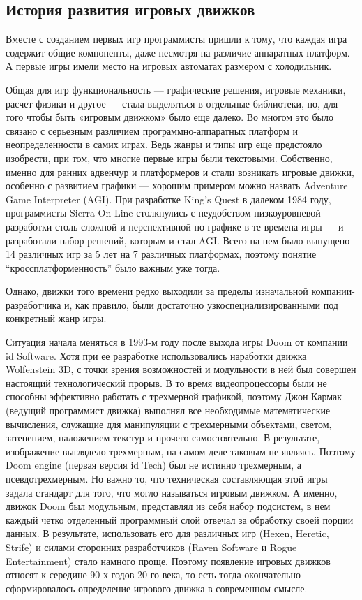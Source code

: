 \subsection{История развития игровых движков}
\label{sub:domain:game_engint_hist}
Вместе с созданием первых игр программисты пришли к тому, что каждая игра содержит общие компоненты, даже несмотря на различие аппаратных платформ. А первые игры имели место на игровых автоматах размером с холодильник.

Общая для игр функциональность — графические решения, игровые механики, расчет физики и другое — стала выделяться в отдельные библиотеки, но, для того чтобы быть «игровым движком» было еще далеко. Во многом это было связано с серьезным различием программно-аппаратных платформ и неопределенности в самих играх. Ведь жанры и типы игр еще предстояло изобрести, при том, что многие первые игры были текстовыми. Собственно, именно для ранних адвенчур и платформеров и стали возникать игровые движки, особенно с развитием графики — хорошим примером можно назвать Adventure Game Interpreter (AGI). При разработке King’s Quest в далеком 1984 году, программисты Sierra On-Line столкнулись с неудобством низкоуровневой разработки столь сложной и перспективной по графике в те времена игры — и разработали набор решений, которым и стал AGI. Всего на нем было выпущено 14 различных игр за 5 лет на 7 различных платформах, поэтому понятие “кроссплатформенность” было важным уже тогда.

Однако, движки того времени редко выходили за пределы изначальной компании-разработчика и, как правило, были достаточно узкоспециализированными под конкретный жанр игры.

Ситуация начала меняться в 1993-м году после выхода игры Doom от компании id Software. Хотя при ее разработке использовались наработки движка Wolfenstein 3D, с точки зрения возможностей и модульности в ней был совершен настоящий технологический прорыв. В то время видеопроцессоры были не способны эффективно работать с трехмерной графикой, поэтому Джон Кармак (ведущий программист движка) выполнял все необходимые математические вычисления, служащие для манипуляции с трехмерными объектами, светом, затенением, наложением текстур и прочего самостоятельно. В результате, изображение выглядело трехмерным, на самом деле таковым не являясь. Поэтому Doom engine (первая версия id Tech) был не истинно трехмерным, а псевдотрехмерным. Но важно то, что техническая составляющая этой игры задала стандарт для того, что могло называться игровым движком. А именно, движок Doom был модульным, представлял из себя набор подсистем, в нем каждый четко отделенный программный слой отвечал за обработку своей порции данных. В результате, использовать его для различных игр (Hexen, Heretic, Strife) и силами сторонних разработчиков (Raven Software и Rogue Entertainment) стало намного проще. Поэтому появление игровых движков относят к середине 90-х годов 20-го века, то есть тогда окончательно сформировалось определение игрового движка в современном смысле.

